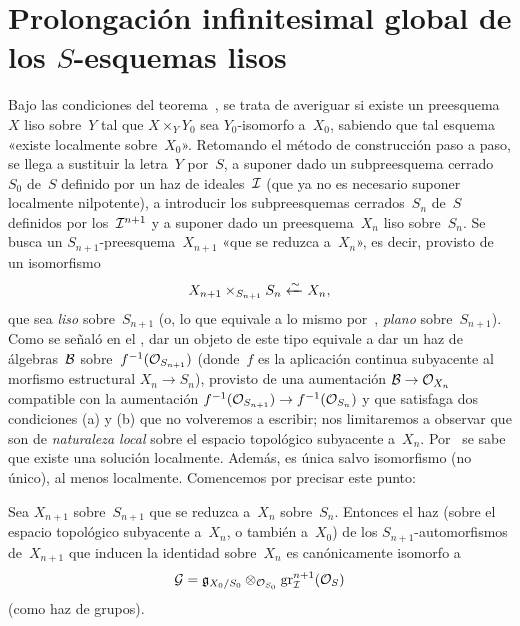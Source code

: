 
\section{Prolongación infinitesimal global de los $S$-esquemas lisos}
\label{III.6}

Bajo las condiciones del teorema~, se trata de averiguar si existe un preesquema~$X$ liso sobre~$Y$ tal que $X\times_YY_0$ sea $Y_0$-isomorfo a~$X_0$, sabiendo que tal esquema «existe localmente sobre~$X_0$». Retomando el método de construcción paso a paso, se llega a sustituir la letra~$Y$ por~$S$, a suponer dado un subpreesquema cerrado~$S_0$ de~$S$ definido por un haz de ideales~$\cal{I}$ (que ya no es necesario suponer localmente nilpotente), a introducir los subpreesquemas cerrados~$S_n$ de~$S$ definidos por los~$\cal{I}^{n+1}$ y a suponer dado un preesquema~$X_n$ liso sobre~$S_n$. Se busca un $S_{n+1}$-preesquema~$X_{n+1}$ «que se reduzca a~$X_n$», es decir, provisto de un isomorfismo
\begin{equation*}
X_{n+1}\times_{S_{n+1}}S_n\isomfrom X_n,
\end{equation*}
que sea \emph{liso} sobre~$S_{n+1}$ (o, lo que equivale a lo mismo por~, \emph{plano} sobre~$S_{n+1}$). Como se señaló en el \No{}, dar un objeto de este tipo equivale a dar un haz de álgebras~$\cal{B}$ sobre~$f^{-1}(\cal{O}_{S_{n+1}})$ (donde~$f$ es la aplicación continua subyacente al morfismo estructural $X_n\to S_n$), provisto de una aumentación $\cal{B}\to\cal{O}_{X_n}$ compatible con la aumentación $f^{-1}(\cal{O}_{S_{n+1}})\to f^{-1}(\cal{O}_{S_n})$ y que satisfaga dos condiciones (a) y (b) que no volveremos a escribir; nos limitaremos a observar que son de \emph{naturaleza local} sobre el espacio topológico subyacente a~$X_n$. Por~ se sabe que existe una solución localmente. Además, es única salvo isomorfismo (no único), al menos localmente. Comencemos por precisar este punto:

\begin{proposition}
\label{III.6.1}
Sea
$X_{n+1}$ sobre~$S_{n+1}$ que se reduzca a~$X_n$ sobre~$S_n$. Entonces el haz (sobre el espacio topológico subyacente a~$X_n$, o también a~$X_0$) de los $S_{n+1}$-automorfismos de~$X_{n+1}$ que inducen la identidad sobre~$X_n$ es canónicamente isomorfo a
\begin{equation*}
\cal{G}=\goth{g}_{X_0/S_0}\otimes_{\cal{O}_{S_0}}
\gr_{\cal{I}}^{n+1}(\cal{O}_S)
\end{equation*}
(como haz de grupos).
\end{proposition}

